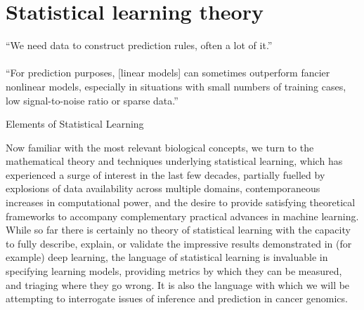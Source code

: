 \documentclass[thesis.tex]{subfiles}
\begin{document}
\section{Statistical learning theory} \label{sec:statistical_learning}
\epigraph{``We need data to construct prediction rules, often a lot of it.'' \\
~\\
``For prediction purposes, [linear models] can sometimes outperform fancier
nonlinear models, especially in situations with small numbers of training
cases, low signal-to-noise ratio or sparse data.''}{Elements of Statistical Learning \\
\citep{hastie_elements_2009}}

Now familiar with the most relevant biological concepts, we turn to the mathematical theory and techniques underlying statistical learning, which has experienced a surge of interest in the last few decades, partially fuelled by explosions of data availability across multiple domains, contemporaneous increases in computational power, and the desire to provide satisfying theoretical frameworks to accompany complementary practical advances in machine learning. While so far there is certainly no theory of statistical learning with the capacity to fully describe, explain, or validate the impressive results demonstrated in (for example) deep learning, the language of statistical learning is invaluable in specifying learning models, providing metrics by which they can be measured, and triaging where they go wrong. It is also the language with which we will be attempting to interrogate issues of inference and prediction in cancer genomics. 
\end{document}
